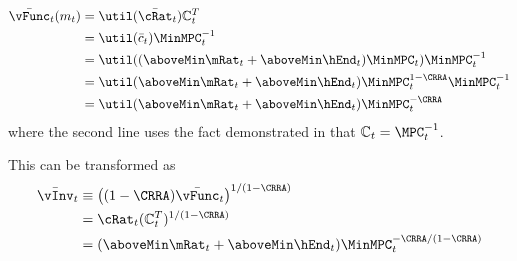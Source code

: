   \begin{equation}\begin{gathered}\begin{aligned}
    \bar{\vFunc}_{t}({m}_{t})  & = \util(\bar{\cRat}_{t})\mathbb{C}_{t}^{T}\label{eq:vFuncPF}
    \\  & = \util(\bar{c}_{t}) \MinMPC_{t}^{-1} %
    \\  & = \util((\aboveMin \mRat_{t}+\aboveMin \hEnd_{t})\MinMPC_{t}) \MinMPC_{t}^{-1} %
    \\  & = \util(\aboveMin \mRat_{t}+\aboveMin \hEnd_{t})\MinMPC_{t}^{1-\CRRA} \MinMPC_{t}^{-1} %
    \\  & = \util(\aboveMin \mRat_{t}+\aboveMin \hEnd_{t})\MinMPC_{t}^{-\CRRA}  %
  \end{aligned}\end{gathered}\end{equation}
  where the second line uses the fact demonstrated in \cite{BufferStockTheory} that $\mathbb{C}_{t}=\MPC^{-1}_{t}$. %

  This can be transformed as
  \begin{equation*}\begin{gathered}\begin{aligned}
    \bar{\vInv}_{t}  & \equiv  \left((1-\CRRA)\bar{\vFunc}_{t}\right)^{1/(1-\CRRA)}
    \\  & = \cRat_{t}(\mathbb{C}_{t}^{T})^{1/(1-\CRRA)}
    \\  & = (\aboveMin \mRat_{t}+\aboveMin \hEnd_{t})\MinMPC_{t}^{-\CRRA/(1-\CRRA)}   %
  \end{aligned}\end{gathered}\end{equation*}
